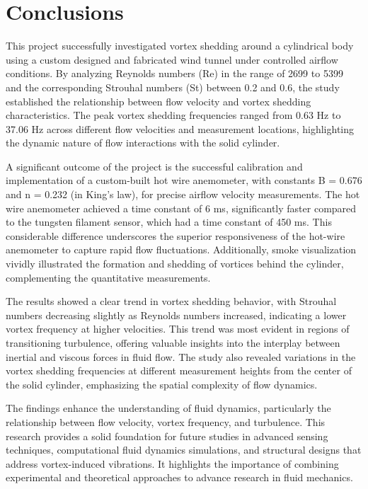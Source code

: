 \chapter{Conclusions}\label{ch:conclusions}
This project successfully investigated vortex shedding around a cylindrical body using a custom designed and fabricated wind tunnel under controlled airflow conditions. By analyzing Reynolds numbers (Re) in the range of 2699 to 5399 and the corresponding Strouhal numbers (St) between 0.2 and 0.6, the study established the relationship between flow velocity and vortex shedding characteristics. The peak vortex shedding frequencies ranged from 0.63 Hz to 37.06 Hz across different flow velocities and measurement locations, highlighting the dynamic nature of flow interactions with the solid cylinder. 

A significant outcome of the project is the successful calibration and implementation of a custom-built hot wire anemometer, with constants B = 0.676 and n = 0.232 (in King's law), for precise airflow velocity measurements. The hot wire anemometer achieved a time constant of 6 ms, significantly faster compared to the tungsten filament sensor, which had a time constant of 450 ms. This considerable difference underscores the superior responsiveness of the hot-wire anemometer to capture rapid flow fluctuations. Additionally, smoke visualization vividly illustrated the formation and shedding of vortices behind the cylinder, complementing the quantitative measurements.

The results showed a clear trend in vortex shedding behavior, with Strouhal numbers decreasing slightly as Reynolds numbers increased, indicating a lower vortex frequency at higher velocities. This trend was most evident in regions of transitioning turbulence, offering valuable insights into the interplay between inertial and viscous forces in fluid flow. The study also revealed variations in the vortex shedding frequencies at different measurement heights from the center of the solid cylinder, emphasizing the spatial complexity of flow dynamics.

The findings enhance the understanding of fluid dynamics, particularly the relationship between flow velocity, vortex frequency, and turbulence. This research provides a solid foundation for future studies in advanced sensing techniques, computational fluid dynamics simulations, and structural designs that address vortex-induced vibrations. It highlights the importance of combining experimental and theoretical approaches to advance research in fluid mechanics.

